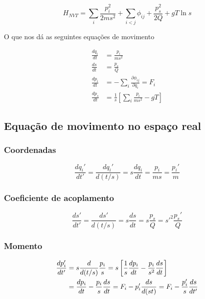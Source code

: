 \documentclass[twoside, a4paper]{scrartcl}
\newcommand{\phiij}{\phi_{ij}}
\newcommand{\del}[2]{\frac{\partial #1}{\partial #2}}
\newcommand{\deri}[2]{\frac{d #1}{d #2}}
\begin{document}
\begin{equation}
	H_{NVT} = \sum_i \frac{p_i^2}{2ms^2} + \sum_{i<j} \phiij + \frac{p_s^2}{2Q} + gT \ln s
\end{equation}

O que nos dá as seguintes equações de movimento

\begin{subequations}
	\begin{align}
		\deri{q_i}{t} &= \frac{p_i}{ms^2}\\
		\deri{s}{t} &= \frac{p_s}{Q}\\
		\deri{p_i}{t} &= -\sum_i \del{\phiij}{q_i} = F_i \\
		\deri{p_s}{t} &= \frac{1}{s} \left[\sum_i \frac{p_i}{ms^2} - gT\right]
	\end{align}
\end{subequations}

\subsection{Equação de movimento no espaço real}

\subsubsection*{Coordenadas}

\begin{equation}
	\deri{q_i'}{t'} = \deri{q_i'}{(t/s)} = s \deri{q_i}{t} = \frac{p_i}{ms} = \frac{p_i'}{m}
\end{equation}

\subsubsection*{Coeficiente de acoplamento}

\begin{equation}
	\deri{s'}{t'} = \deri{s'}{(t/s)} = s \deri{s}{t} = s\frac{p_s}{Q}= s'^2\frac{p_s'}{Q}
\end{equation}

\subsubsection*{Momento}

\begin{align}
	\deri{p_i'}{t'} &= s \deri{}{(t/s)} \frac{p_i}{s} = s\left[\frac{1}{s}\deri{p_i}{t} - \frac{p_i}{s^2}\deri{s}{t}\right]\notag \\
			&= \deri{p_i}{t} - \frac{p_i}{s}\deri{s}{t} = F_i - p_i' \deri{s}{(st)} = F_i - \frac{p_i'}{s}\frac{ds}{dt'}
\end{align}
\end{document}
